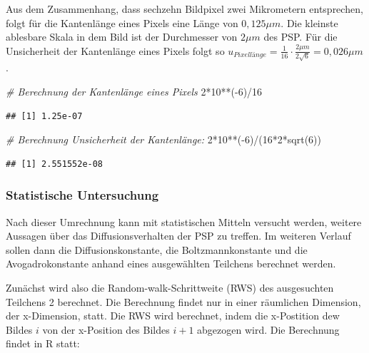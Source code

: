 \documentclass[
  9pt,
]{article}
\newenvironment{Shaded}{\begin{snugshade}}{\end{snugshade}}
\newcommand{\CommentTok}[1]{\textcolor[rgb]{0.56,0.35,0.01}{\textit{#1}}}
\newcommand{\DecValTok}[1]{\textcolor[rgb]{0.00,0.00,0.81}{#1}}
\newcommand{\FunctionTok}[1]{\textcolor[rgb]{0.00,0.00,0.00}{#1}}
\newcommand{\NormalTok}[1]{#1}
\newcommand{\SpecialCharTok}[1]{\textcolor[rgb]{0.00,0.00,0.00}{#1}}
\begin{document}
Aus dem Zusammenhang, dass sechzehn Bildpixel zwei Mikrometern
entsprechen, folgt für die Kantenlänge eines Pixels eine Länge von
\(0,125 \mu m\). Die kleinste ablesbare Skala in dem Bild ist der
Durchmesser von \(2\mu m\) des PSP. Für die Unsicherheit der Kantenlänge
eines Pixels folgt so
\(u_{Pixellänge} = \frac{1}{16}\cdot \frac{2\mu m}{2\sqrt{6}} = 0,026\mu m\).

\begin{Shaded}
\begin{Highlighting}[]
\CommentTok{\# Berechnung der Kantenlänge eines Pixels}
\DecValTok{2}\SpecialCharTok{*}\DecValTok{10}\SpecialCharTok{**}\NormalTok{(}\SpecialCharTok{{-}}\DecValTok{6}\NormalTok{)}\SpecialCharTok{/}\DecValTok{16}
\end{Highlighting}
\end{Shaded}

\begin{verbatim}
## [1] 1.25e-07
\end{verbatim}

\begin{Shaded}
\begin{Highlighting}[]
\CommentTok{\# Berechnung Unsicherheit der Kantenlänge:}
\DecValTok{2}\SpecialCharTok{*}\DecValTok{10}\SpecialCharTok{**}\NormalTok{(}\SpecialCharTok{{-}}\DecValTok{6}\NormalTok{)}\SpecialCharTok{/}\NormalTok{(}\DecValTok{16}\SpecialCharTok{*}\DecValTok{2}\SpecialCharTok{*}\FunctionTok{sqrt}\NormalTok{(}\DecValTok{6}\NormalTok{))}
\end{Highlighting}
\end{Shaded}

\begin{verbatim}
## [1] 2.551552e-08
\end{verbatim}

\hypertarget{statistische-untersuchung}{%
\subsubsection{Statistische
Untersuchung}\label{statistische-untersuchung}}

Nach dieser Umrechnung kann mit statistischen Mitteln versucht werden,
weitere Aussagen über das Diffusionsverhalten der PSP zu treffen. Im
weiteren Verlauf sollen dann die Diffusionskonstante, die
Boltzmannkonstante und die Avogadrokonstante anhand eines ausgewählten
Teilchens berechnet werden.

Zunächst wird also die Random-walk-Schrittweite (RWS) des ausgesuchten
Teilchens 2 berechnet. Die Berechnung findet nur in einer räumlichen
Dimension, der x-Dimension, statt. Die RWS wird berechnet, indem die
x-Postition dew Bildes \(i\) von der x-Position des Bildes \(i+1\)
abgezogen wird. Die Berechnung findet in R statt:
\end{document}
